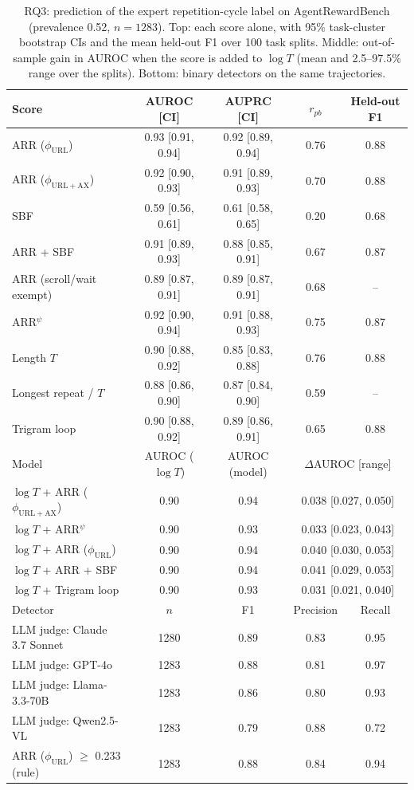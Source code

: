 \begin{table}[t]
\centering
\caption{RQ3: prediction of the expert repetition-cycle label on AgentRewardBench (prevalence 0.52, $n=1283$). Top: each score alone, with 95\%
task-cluster bootstrap CIs and the mean held-out F1 over 100 task splits. Middle: out-of-sample gain in AUROC when
the score is added to $\log T$ (mean and 2.5--97.5\% range over the splits). Bottom: binary detectors on the same
trajectories.}
\label{tab:rq3}
\footnotesize
\begin{tabular}{@{}lcccc@{}}
\toprule
Score & AUROC [CI] & AUPRC [CI] & $r_{pb}$ & Held-out F1 \\
\midrule
ARR ($\phi_{\mathrm{URL}}$) & 0.93 [0.91, 0.94] & 0.92 [0.89, 0.94] & 0.76 & 0.88 \\
ARR ($\phi_{\mathrm{URL+AX}}$) & 0.92 [0.90, 0.93] & 0.91 [0.89, 0.93] & 0.70 & 0.88 \\
SBF & 0.59 [0.56, 0.61] & 0.61 [0.58, 0.65] & 0.20 & 0.68 \\
ARR + SBF & 0.91 [0.89, 0.93] & 0.88 [0.85, 0.91] & 0.67 & 0.87 \\
ARR (scroll/wait exempt) & 0.89 [0.87, 0.91] & 0.89 [0.87, 0.91] & 0.68 & -- \\
ARR$^{\psi}$ & 0.92 [0.90, 0.94] & 0.91 [0.88, 0.93] & 0.75 & 0.87 \\
Length $T$ & 0.90 [0.88, 0.92] & 0.85 [0.83, 0.88] & 0.76 & 0.88 \\
Longest repeat / $T$ & 0.88 [0.86, 0.90] & 0.87 [0.84, 0.90] & 0.59 & -- \\
Trigram loop & 0.90 [0.88, 0.92] & 0.89 [0.86, 0.91] & 0.65 & 0.88 \\
\midrule
Model & AUROC ($\log T$) & AUROC (model) & \multicolumn{2}{c}{$\Delta$AUROC [range]} \\
\midrule
$\log T$ + ARR ($\phi_{\mathrm{URL+AX}}$) & 0.90 & 0.94 & \multicolumn{2}{c}{0.038 [0.027, 0.050]} \\
$\log T$ + ARR$^{\psi}$ & 0.90 & 0.93 & \multicolumn{2}{c}{0.033 [0.023, 0.043]} \\
$\log T$ + ARR ($\phi_{\mathrm{URL}}$) & 0.90 & 0.94 & \multicolumn{2}{c}{0.040 [0.030, 0.053]} \\
$\log T$ + ARR + SBF & 0.90 & 0.94 & \multicolumn{2}{c}{0.041 [0.029, 0.053]} \\
$\log T$ + Trigram loop & 0.90 & 0.93 & \multicolumn{2}{c}{0.031 [0.021, 0.040]} \\
\midrule
Detector & $n$ & F1 & Precision & Recall \\
\midrule
LLM judge: Claude 3.7 Sonnet & 1280 & 0.89 & 0.83 & 0.95 \\
LLM judge: GPT-4o & 1283 & 0.88 & 0.81 & 0.97 \\
LLM judge: Llama-3.3-70B & 1283 & 0.86 & 0.80 & 0.93 \\
LLM judge: Qwen2.5-VL & 1283 & 0.79 & 0.88 & 0.72 \\
ARR ($\phi_{\mathrm{URL}}$) $\ge$ 0.233 (rule) & 1283 & 0.88 & 0.84 & 0.94 \\
\bottomrule
\end{tabular}
\end{table}
